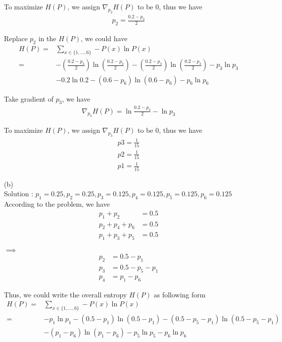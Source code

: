 \documentclass[twoside,11pt]{homework}
\begin{document}
To maximize $H(P)$, we assign $\nabla_{p_2}H(P)$ to be 0, thus we have 
\begin{align*}
p_2 = \frac {0.2 - p_3}{2}
\end{align*}

Replace $p_2$ in the $H(P)$, we could have 
\begin{align*}
H(P) =& \sum _{x \in \{1, ..., 6\}} - P(x) \ln P(x) \\
 = & - (\frac{0.2 - p_3}{2})\ln (\frac{0.2 - p_3}{2})  - (\frac{0.2 - p_3}{2})\ln(\frac{0.2 - p_3}{2}) - p_3 \ln p_3  \\
& - 0.2 \ln 0.2 - (0.6 - p_6) \ln (0.6 - p_6) - p_6 \ln p_6
\end{align*}

Take gradient of $p_3$, we have
\begin{align*}
\nabla_{p_3}H(P) = \ln \frac{0.2 - p_3}{2} - \ln p_3
\end{align*}

To maximize $H(P)$, we assign $\nabla_{p_3}H(P)$ to be 0, thus we have 
\begin{align*}
p3 = \frac {1}{15} \\
p2 = \frac {1}{15} \\
p1 = \frac {1}{15}
\end{align*}

(b) \\ \indent
Solution : $p_1 =  0.25, p_2 = 0.25,  p_3 = 0.125, p_4 = 0.125 , p_5 = 0.125, p_6 =  0.125$ \\
According to the problem, we have 
\begin{align*}
p_1 + p_2 &= 0.5 \\
p_2 + p_4 + p_6  &= 0.5 \\
p_1 + p_3 + p_5 &= 0.5
\end{align*}

$\implies$ 
\begin{align*}
p_2 &= 0.5 - p_1\\
p_3 &= 0.5 - p_5 - p_1 \\
p_4 &= p_1 - p_6
\end{align*}

Thus, we could write the overall entropy $H(P)$ as following form
\begin{align*}
H(P) =& \sum _{x \in \{1, ..., 6\}} - P(x) \ln P(x) \\
 = & - p_1 \ln p_1  - (0.5 - p_1) \ln (0.5 - p_1)- (0.5 - p_5 - p_1 ) \ln (0.5 - p_5 - p_1) \\
& - (p_1 - p_6) \ln (p_1 - p_6) - p_5 \ln p_5 - p_6 \ln p_6
\end{align*}
\end{document}
